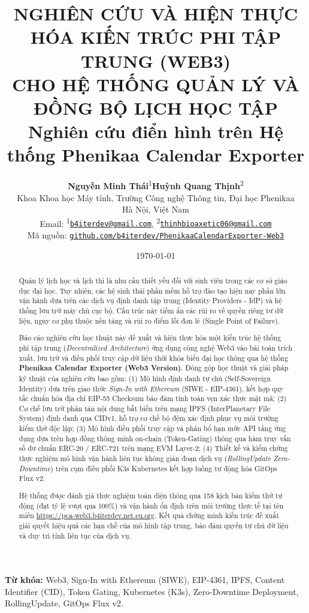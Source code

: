 \documentclass[11pt,a4paper]{article}
\title{\LARGE\textbf{NGHIÊN CỨU VÀ HIỆN THỰC HÓA KIẾN TRÚC PHI TẬP TRUNG (WEB3)\\CHO HỆ THỐNG QUẢN LÝ VÀ ĐỒNG BỘ LỊCH HỌC TẬP}\\
\vspace{0.4cm}
\large\textbf{Nghiên cứu điển hình trên Hệ thống Phenikaa Calendar Exporter}}
\author{
    \textbf{Nguyễn Minh Thái}\textsuperscript{1}\quad\quad\textbf{Huỳnh Quang Thịnh}\textsuperscript{2} \\
    Khoa Khoa học Máy tính, Trường Công nghệ Thông tin, Đại học Phenikaa \\
    Hà Nội, Việt Nam \\
    Email: \textsuperscript{1}\href{mailto:b4iterdev@gmail.com}{\texttt{b4iterdev@gmail.com}},\quad
    \textsuperscript{2}\href{mailto:thinhbioaxetic06@gmail.com}{\texttt{thinhbioaxetic06@gmail.com}} \\
    Mã nguồn: \href{https://github.com/b4iterdev/PhenikaaCalendarExporter-Web3}{\texttt{github.com/b4iterdev/PhenikaaCalendarExporter-Web3}}
}
\date{\today}
\begin{document}
\maketitle

\begin{abstract}
Quản lý lịch học và lịch thi là nhu cầu thiết yếu đối với sinh viên trong các cơ sở giáo dục đại học. Tuy nhiên, các hệ sinh thái phần mềm hỗ trợ đào tạo hiện nay phần lớn vận hành dựa trên các dịch vụ định danh tập trung (Identity Providers - IdP) và hệ thống lưu trữ máy chủ cục bộ. Cấu trúc này tiềm ẩn các rủi ro về quyền riêng tư dữ liệu, nguy cơ phụ thuộc nền tảng và rủi ro điểm lỗi đơn lẻ (Single Point of Failure).

Báo cáo nghiên cứu học thuật này đề xuất và hiện thực hóa một kiến trúc hệ thống phi tập trung (\textit{Decentralized Architecture}) ứng dụng công nghệ Web3 vào bài toán trích xuất, lưu trữ và điều phối truy cập dữ liệu thời khóa biểu đại học thông qua hệ thống \textbf{Phenikaa Calendar Exporter (Web3 Version)}. Đóng góp học thuật và giải pháp kỹ thuật của nghiên cứu bao gồm:
(1) Mô hình định danh tự chủ (Self-Sovereign Identity) dựa trên giao thức \textit{Sign-In with Ethereum} (SIWE - EIP-4361), kết hợp quy tắc chuẩn hóa địa chỉ EIP-55 Checksum bảo đảm tính toàn vẹn xác thực mật mã;
(2) Cơ chế lưu trữ phân tán nội dung bất biến trên mạng IPFS (InterPlanetary File System) định danh qua CIDv1, hỗ trợ cơ chế bộ đệm xác định phục vụ môi trường kiểm thử độc lập;
(3) Mô hình điều phối truy cập và phân bổ hạn mức API tầng ứng dụng dựa trên hợp đồng thông minh on-chain (Token-Gating) thông qua hàm truy vấn số dư chuẩn ERC-20 / ERC-721 trên mạng EVM Layer-2;
(4) Thiết kế và kiểm chứng thực nghiệm mô hình vận hành liên tục không gián đoạn dịch vụ (\textit{RollingUpdate Zero-Downtime}) trên cụm điều phối K3s Kubernetes kết hợp luồng tự động hóa GitOps Flux v2.

Hệ thống được đánh giá thực nghiệm toàn diện thông qua 158 kịch bản kiểm thử tự động (đạt tỷ lệ vượt qua 100\%) và vận hành ổn định trên môi trường thực tế tại tên miền \url{https://pca-web3.b4iterdev.net.eu.org}. Kết quả chứng minh kiến trúc đề xuất giải quyết hiệu quả các hạn chế của mô hình tập trung, bảo đảm quyền tự chủ dữ liệu và duy trì tính liên tục của dịch vụ.
\end{abstract}

\vspace{0.5cm}
\noindent\textbf{Từ khóa:} Web3, Sign-In with Ethereum (SIWE), EIP-4361, IPFS, Content Identifier (CID), Token Gating, Kubernetes (K3s), Zero-Downtime Deployment, RollingUpdate, GitOps Flux v2.
\end{document}

